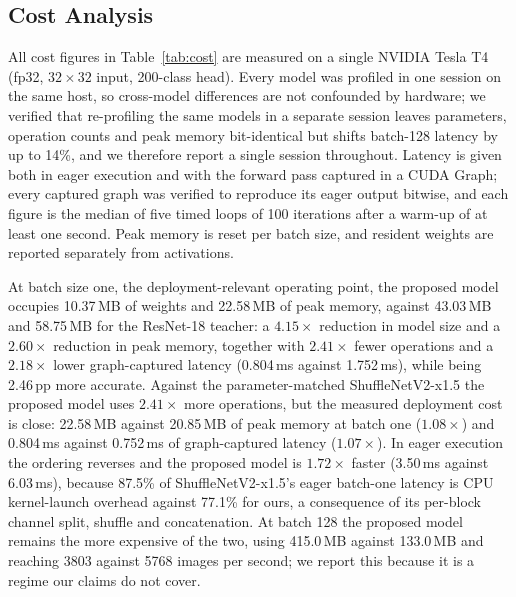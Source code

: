 \subsection{Cost Analysis}
\label{sec:cost}

All cost figures in Table~\ref{tab:cost} are measured on a single NVIDIA
Tesla T4 (fp32, $32\times32$ input, 200-class head). Every model was profiled
in one session on the same host, so cross-model differences are not
confounded by hardware; we verified that re-profiling the same models in a
separate session leaves parameters, operation counts and peak memory
bit-identical but shifts batch-128 latency by up to 14\%, and we therefore
report a single session throughout. Latency is given both in eager execution
and with the forward pass captured in a CUDA Graph; every captured graph was
verified to reproduce its eager output bitwise, and each figure is the median
of five timed loops of 100 iterations after a warm-up of at least one second.
Peak memory is reset per batch size, and resident weights are reported
separately from activations.

At batch size one, the deployment-relevant operating point, the proposed model
occupies 10.37\,MB of weights and 22.58\,MB of peak memory, against 43.03\,MB
and 58.75\,MB for the ResNet-18 teacher: a $4.15\times$ reduction in model
size and a $2.60\times$ reduction in peak memory, together with $2.41\times$
fewer operations and a $2.18\times$ lower graph-captured latency (0.804\,ms
against 1.752\,ms), while being 2.46\,pp more accurate. Against the
parameter-matched ShuffleNetV2-x1.5 the proposed model uses $2.41\times$ more
operations, but the measured deployment cost is close: 22.58\,MB against
20.85\,MB of peak memory at batch one ($1.08\times$) and 0.804\,ms against
0.752\,ms of graph-captured latency ($1.07\times$). In eager execution the
ordering reverses and the proposed model is $1.72\times$ faster (3.50\,ms
against 6.03\,ms), because 87.5\% of ShuffleNetV2-x1.5's eager batch-one
latency is CPU kernel-launch overhead against 77.1\% for ours, a consequence
of its per-block channel split, shuffle and concatenation. At batch 128 the
proposed model remains the more expensive of the two, using 415.0\,MB against
133.0\,MB and reaching 3803 against 5768 images per second; we report this
because it is a regime our claims do not cover.

